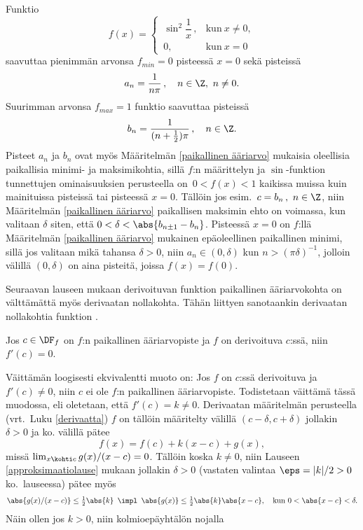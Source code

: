 \begin{Exa} Funktio
\[
f(x)=\begin{cases}
     \,\sin^2\dfrac{1}{x}\,, &\text{kun}\ x \neq 0, \\[2mm] \,0, &\text{kun}\ x=0
     \end{cases}
\]
saavuttaa pienimmän arvonsa $f_{min}=0$ pisteessä $x=0$ sekä pisteissä 
\[
a_n=\frac{1}{n\pi}\,, \quad n\in\Z,\ n \neq 0.
\]
Suurimman arvonsa $f_{max}=1$ funktio saavuttaa pisteissä 
\[
b_n=\frac{1}{(n+\frac{1}{2})\pi}\,, \quad n\in\Z.
\]
Pisteet $a_n$ ja $b_n$ ovat myös Määritelmän \ref{paikallinen ääriarvo} mukaisia oleellisia
paikallisia minimi- ja maksimikohtia, sillä $f$:n määrittelyn ja $\sin$-funktion tunnettujen
ominaisuuksien perusteella on $\,0<f(x)<1$ kaikissa muissa kuin mainituissa pisteissä tai
pisteessä $x=0$. Tällöin jos esim.\ $c=b_n\,,\ n\in\Z$, niin Määritelmän
\ref{paikallinen ääriarvo} paikallisen maksimin ehto on voimassa, kun valitaan $\delta$ siten,
että $0<\delta<\abs{b_{n \pm 1}-b_n}$. Pisteessä $x=0$ on $f$:llä Määritelmän
\ref{paikallinen ääriarvo} mukainen epäoleellinen paikallinen minimi, sillä jos valitaan mikä
tahansa $\delta>0$, niin $a_n\in(0,\delta)$ kun $n>(\pi\delta)^{-1}$, jolloin välillä
$(0,\delta)$ on aina pisteitä, joissa $f(x)=f(0)$. \loppu
\end{Exa}
Seuraavan lauseen mukaan derivoituvan funktion paikallinen ääriarvokohta on välttämättä myös
derivaatan nollakohta. Tähän liittyen sanotaankin derivaatan nollakohtia funktion
%
.
\begin{Lause} \label{ääriarvolause}
Jos $c\in\DF_f$ on $f$:n paikallinen ääriarvopiste ja $f$ on derivoituva $c$:ssä, 
niin $f'(c)=0$.
\end{Lause}
\tod Väittämän loogisesti ekvivalentti muoto on: Jos $f$ on $c$:ssä derivoituva ja 
$f'(c) \neq 0$, niin $c$ ei ole $f$:n paikallinen ääriarvopiste. Todistetaan väittämä tässä
muodossa, eli oletetaan, että $f'(c) = k \neq0$. Derivaatan määritelmän perusteella
(vrt.\ Luku \ref{derivaatta}) $f$ on tällöin määritelty välillä $(c-\delta,c+\delta)$ jollakin
$\delta>0$ ja ko. välillä pätee 
\[
f(x)=f(c)+k(x-c)+g(x),
\]
missä $\lim_{x\kohti c} g(x)/(x-c) =0$. Tällöin koska $k \neq 0$, niin Lauseen
\ref{approksimaatiolause} mukaan jollakin $\delta>0$ (vastaten valintaa $\eps=|k|/2>0$
ko.\ lauseessa) pätee myös
\[
\abs{g(x)/(x-c)} \le \tfrac{1}{2}\abs{k}\,\ 
   \impl\,\ \abs{g(x)} \le \tfrac{1}{2}\abs{k}\abs{x-c}, \quad \text{kun}\ 0<\abs{x-c}<\delta.
\] 
Näin ollen jos $k>0$, niin kolmioepäyhtälön nojalla
